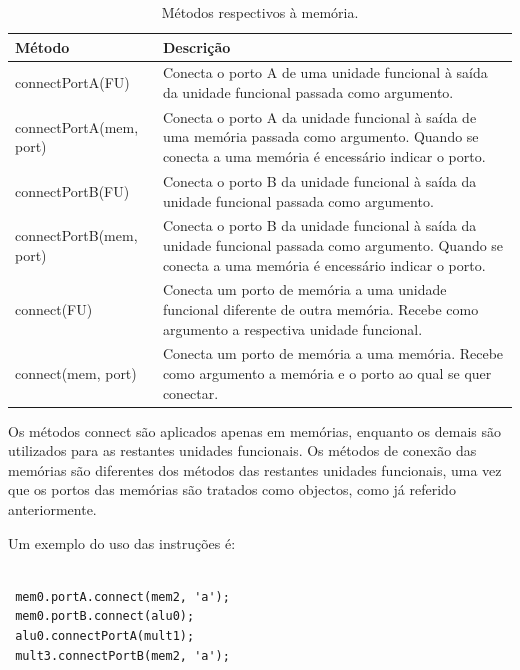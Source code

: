 \begin{table}[h!]
    \caption[Métodos respectivos à memória.]{Métodos respectivos à memória.}
  \begin{center}
    \begin{tabular}{|l|L{7cm}|}
      \hline
      {\bf Método} & {\bf Descrição} \\
      \hline \hline
     
      connectPortA(FU) & Conecta o porto A de uma unidade funcional à saída da unidade funcional passada como argumento. \\
      connectPortA(mem, port) & Conecta o porto A da unidade funcional à saída de uma memória passada como argumento. Quando se conecta a uma memória é encessário indicar o porto. \\
      connectPortB(FU) & Conecta o porto B da unidade funcional à saída da unidade funcional passada como argumento. \\
       connectPortB(mem, port) & Conecta o porto B da unidade funcional à saída da unidade funcional passada como argumento. Quando se conecta a uma memória é encessário indicar o porto. \\
      connect(FU) & Conecta um porto de memória a uma unidade funcional diferente de outra memória. Recebe como argumento a respectiva unidade funcional. \\
      connect(mem, port) & Conecta um porto de memória a uma memória. Recebe como argumento a memória e o porto ao qual se quer conectar.\\

      \hline
    \end{tabular}
  \end{center}
  \label{tab:instrconnect}
\end{table}

Os métodos connect são aplicados apenas em memórias, enquanto os demais são utilizados para as restantes unidades funcionais. Os métodos de conexão
das memórias são diferentes dos métodos das restantes unidades funcionais, uma vez que os portos das memórias são tratados como objectos, como já referido anteriormente.

Um exemplo do uso das instruções é:

\begin{lstlisting} 
 
 mem0.portA.connect(mem2, 'a');
 mem0.portB.connect(alu0);
 alu0.connectPortA(mult1);
 mult3.connectPortB(mem2, 'a');	
 
\end{lstlisting}

